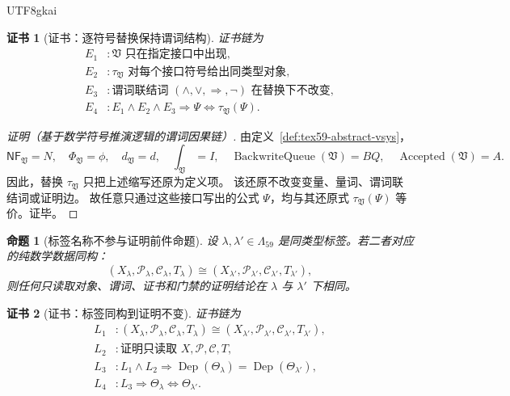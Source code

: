 \documentclass[12pt]{article}
\newtheorem{proposition}{命题}[section]
\newtheorem{Certificate}{证书}[section]
\newcommand{\Vsys}{\mathfrak V}
\newcommand{\NF}{\mathsf{NF}}
\DeclareMathOperator{\Accepted}{Accepted}
\DeclareMathOperator{\BackwriteQueue}{BackwriteQueue}
\DeclareMathOperator{\Dep}{Dep}
\begin{document}
\begin{CJK*}{UTF8}{gkai}
\begin{Certificate}[证书：逐符号替换保持谓词结构]
\label{cert:tex59-vsys-conservative-elimination}
证书链为
\[
\begin{aligned}
  E_1 &: \Vsys\text{ 只在指定接口中出现},\\
  E_2 &: \tau_{\mathfrak V}\text{ 对每个接口符号给出同类型对象},\\
  E_3 &: \text{谓词联结词 }(\wedge,\vee,\Rightarrow,\neg)
         \text{ 在替换下不改变},\\
  E_4 &: E_1\wedge E_2\wedge E_3
         \Rightarrow
         \Psi\Longleftrightarrow\tau_{\mathfrak V}(\Psi).
\end{aligned}
\]
\end{Certificate}

\begin{proof}[证明（基于数学符号推演逻辑的谓词因果链）]
由定义~\ref{def:tex59-abstract-vsys}，
\[
  \NF_{\Vsys}=N,\quad
  \Phi_{\Vsys}=\phi,\quad
  d_{\Vsys}=d,\quad
  \int_{\Vsys}=I,\quad
  \BackwriteQueue(\Vsys)=BQ,\quad
  \Accepted(\Vsys)=A.
\]
因此，替换 \(\tau_{\mathfrak V}\) 只把上述缩写还原为定义项。
该还原不改变变量、量词、谓词联结词或证明边。
故任意只通过这些接口写出的公式 \(\Psi\)，均与其还原式
\(\tau_{\mathfrak V}(\Psi)\) 等价。证毕。
\end{proof}

\begin{proposition}[标签名称不参与证明前件命题]
\label{prop:tex59-label-nondependence}
设 \(\lambda,\lambda'\in\Lambda_{59}\) 是同类型标签。若二者对应的纯数学数据同构：
\[
  (X_\lambda,\mathcal P_\lambda,\mathcal C_\lambda,T_\lambda)
  \cong
  (X_{\lambda'},\mathcal P_{\lambda'},\mathcal C_{\lambda'},T_{\lambda'}),
\]
则任何只读取对象、谓词、证书和门禁的证明结论在 \(\lambda\) 与 \(\lambda'\) 下相同。
\end{proposition}

\begin{Certificate}[证书：标签同构到证明不变]
\label{cert:tex59-label-nondependence}
证书链为
\[
\begin{aligned}
  L_1 &: (X_\lambda,\mathcal P_\lambda,\mathcal C_\lambda,T_\lambda)
        \cong
        (X_{\lambda'},\mathcal P_{\lambda'},\mathcal C_{\lambda'},T_{\lambda'}),\\
  L_2 &: \text{证明只读取 }X,\mathcal P,\mathcal C,T,\\
  L_3 &: L_1\wedge L_2
        \Rightarrow
        \Dep(\Theta_\lambda)=\Dep(\Theta_{\lambda'}),\\
  L_4 &: L_3\Rightarrow
        \Theta_\lambda\Longleftrightarrow\Theta_{\lambda'}.
\end{aligned}
\]
\end{Certificate}


\end{CJK*}
\end{document}
